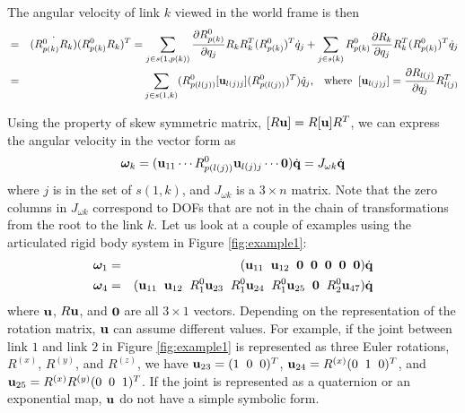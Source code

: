 The angular velocity of link $k$ viewed in the world frame is then
\begin{eqnarray}
[\bm{\omega}_k] & = & \dot{(R^0_{p(k)}R_k)} (R^0_{p(k)}R_k)^T = \sum_{j \in s(1,p(k))}
\frac{\partial R^0_{p(k)}}{\partial q_j} R_k R_k^T (R^0_{p(k)})^T
\dot{q}_j + \sum_{j \in s(k)} R^0_{p(k)} \frac{\partial R_k}{\partial q_j} R_k^T
(R^0_{p(k)})^T \dot{q}_j  \nonumber \\
& = & \sum_{j \in s(1,k)} (R^0_{p(l(j))} [\vc{u}_{l(j)j}] (R^0_{p(l(j))})^T) \dot{q}_j, \;\;\;\mathrm{where}\;\;
[\vc{u}_{l(j)j}] = \frac{\partial R_{l(j)}}{\partial q_j} R_{l(j)}^T
\end{eqnarray}

Using the property of skew symmetric matrix, $[R \mathbf{u}] = R [\mathbf{u}]
R^T$, we can express the angular velocity in the vector form as
\begin{equation}
\label{eq:angular_velocity_link}
\bm{\omega}_k = (\mathbf{u}_{11} \cdots R^0_{p(l(j))} \mathbf{u}_{l(j)j} \cdots \mathbf{0}) \dot{\mathbf{q}} = J_{\omega k} \dot{\mathbf{q}}
\end{equation}
where $j$ is in the set of $s(1,k)$, and $J_{\omega k}$ is a $3 \times
n$ matrix. Note that the zero columns in $J_{\omega k}$ correspond to
DOFs that are not in the chain of transformations from the root to the
link $k$. Let us look at a couple of examples using the articulated
rigid body system in Figure \ref{fig:example1}:
\begin{eqnarray}
\bm{\omega}_1 &=& (\mathbf{u}_{11} \;\; \mathbf{u}_{12} \;\; \mathbf{0}
\;\;\mathbf{0}\;\;\mathbf{0}\;\;\mathbf{0}\;\;\mathbf{0}) \dot{\mathbf{q}}  \nonumber \\
\bm{\omega}_4 &=& (\mathbf{u}_{11} \;\; \mathbf{u}_{12} \;\; R^0_1\mathbf{u}_{23} \;\;
R^0_1\mathbf{u}_{24} \;\;  R^0_1\mathbf{u}_{25} \;\; \mathbf{0} \;\;
R^0_2 \mathbf{u}_{47}) \dot{\mathbf{q}} \nonumber
\end{eqnarray}
where $\mathbf{u}$, $R\mathbf{u}$, and $\mathbf{0}$ are all $3\times 1$
vectors. Depending on the representation of the rotation matrix,
$\mathbf{u}$ can assume different values. For example, if the joint
between link $1$ and link $2$ in Figure \ref{fig:example1} is
represented as three Euler rotations, $R^{(x)}$, $R^{(y)}$, and
$R^{(z)}$, we have $\mathbf{u}_{23} = (1\;\; 0 \;\; 0)^T$, $\mathbf{u}_{24} =
R^{(x)} (0\;\;1\;\;0)^T$, and $\mathbf{u}_{25} = R^{(x)}R^{(y)}
(0\;\;0\;\;1)^T$. If the joint is represented as a quaternion or an
exponential map, $\mathbf{u}$ do not have a simple symbolic form.

